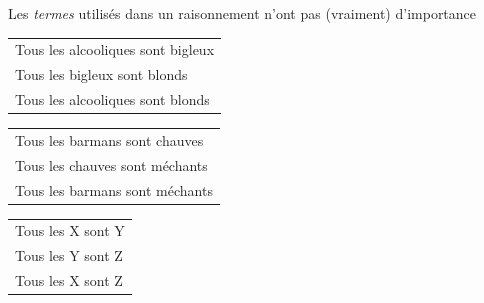 \begin{frame}
	
	\begin{description}[labelindent=6pt,style=multiline,leftmargin=1.3in]
		 \setlength\itemsep{1em}
		 
		 \item[Rappel] Les \textit{termes} utilisés dans un raisonnement n'ont pas (vraiment) d'importance
		 \pause
		 \item[] \begin{tabular}{l}
Tous les alcooliques sont bigleux\\
Tous les bigleux sont blonds\\ \cline{1-1}
Tous les alcooliques sont blonds\\
\end{tabular}
		 \item[$\equiv$] \begin{tabular}{l}
Tous les barmans sont chauves\\
Tous les chauves sont méchants\\ \cline{1-1}
Tous les barmans sont méchants\\
\end{tabular}\pause


		 \item[$\equiv$] \begin{tabular}{l}
Tous les X sont Y\\
Tous les Y sont Z\\ \cline{1-1}
Tous les X sont Z\\
\end{tabular}
	\end{description}
\end{frame}


